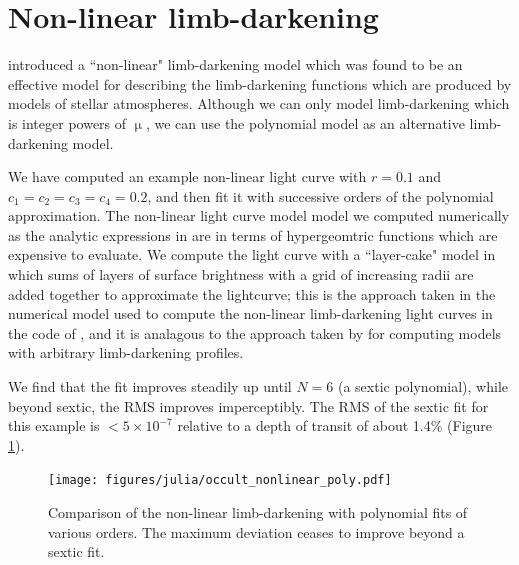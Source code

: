 \documentclass[modern]{aastex61}
\begin{document}
\section{Non-linear limb-darkening}

\citet{Claret2000} introduced a ``non-linear" limb-darkening model which
was found to be an effective model for describing the limb-darkening functions
which are produced by models of stellar atmospheres.
Although we can only model limb-darkening which is integer powers of $\upmu$,
we can use the polynomial model as an alternative limb-darkening model.


We have computed an example non-linear light curve with $r=0.1$ and
$c_1=c_2=c_3=c_4=0.2$, and then fit it with successive orders of the
polynomial approximation.  The non-linear light curve model model
we computed numerically as the analytic expressions in \citet{MandelAgol2002}
are in terms of hypergeomtric functions which are expensive to evaluate.  
We compute the light curve with a ``layer-cake" model in which sums of 
layers of surface brightness with a grid of increasing radii are added together 
to approximate the lightcurve;  this
is the approach taken in the numerical model used to compute the
non-linear limb-darkening light curves in the code of \citet{MandelAgol2002},
and it is analagous to the approach taken by \citet{Kreidberg2015} for
computing models with arbitrary limb-darkening profiles.

We find that the fit improves steadily up until $N=6$ (a sextic
polynomial), while beyond sextic, the RMS improves imperceptibly.
The RMS of the sextic fit for this example is $<5 \times 10^{-7}$
relative to a depth of transit of about 1.4\% (Figure \ref{fig:nonlinear}).

\begin{figure}
    \begin{centering}
    \texttt{[image: figures/julia/occult\_nonlinear\_poly.pdf]}
    \caption{Comparison of the non-linear limb-darkening with polynomial
    fits of various orders.  The maximum deviation ceases to improve
    beyond a sextic fit. }
    \label{fig:nonlinear}
    \end{centering}
\end{figure}
\end{document}
